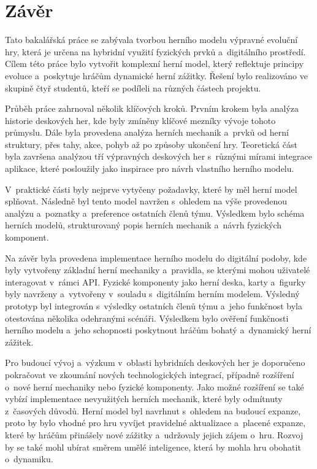 \chapter{Závěr}

Tato bakalářská práce se zabývala tvorbou herního modelu výpravné evoluční hry, která je určena na hybridní využití fyzických prvků a~digitálního prostředí. Cílem této práce bylo vytvořit komplexní herní model, který reflektuje principy evoluce a~poskytuje hráčům dynamické herní zážitky. Řešení bylo realizováno ve skupině čtyř studentů, kteří se podíleli na různých částech projektu.

Průběh práce zahrnoval několik klíčových kroků. Prvním krokem byla analýza historie deskových her, kde byly zmíněny klíčové mezníky vývoje tohoto průmyslu. Dále byla provedena analýza herních mechanik a~prvků od herní struktury, přes tahy, akce, pohyb až po způsoby ukončení hry. Teoretická část byla završena analýzou tří výpravných deskových her s~různými mírami integrace aplikace, které posloužily jako inspirace pro návrh vlastního herního modelu.

V~praktické části byly nejprve vytyčeny požadavky, které by měl herní model splňovat. Následně byl tento model navržen s~ohledem na výše provedenou analýzu a~poznatky a~preference ostatních členů týmu. Výsledkem bylo schéma herních modelů, strukturovaný popis herních mechanik a~návrh fyzických komponent.

Na závěr byla provedena implementace herního modelu do digitální podoby, kde byly vytvořeny základní herní mechaniky a~pravidla, se kterými mohou uživatelé interagovat v~rámci API. Fyzické komponenty jako herní deska, karty a~figurky byly navrženy a~vytvořeny v~souladu s~digitálním herním modelem. Výsledný prototyp byl integrován s~výsledky ostatních členů týmu a~jeho funkčnost byla otestována několika odehranými scénáři. Výsledkem bylo ověření funkčnosti herního modelu a~jeho schopnosti poskytnout hráčům bohatý a~dynamický herní zážitek.

Pro budoucí vývoj a~výzkum v~oblasti hybridních deskových her je doporučeno pokračovat ve zkoumání nových technologických integrací, případně rozšíření o~nové herní mechaniky nebo fyzické komponenty. Jako možné rozšíření se také vybízí implementace nevyužitých herních mechanik, které byly odmítnuty z~časových důvodů. Herní model byl navrhnut s~ohledem na budoucí expanze, proto by bylo vhodné pro hru vyvíjet pravidelné aktualizace a~placené expanze, které by hráčům přinášely nové zážitky a~udržovaly jejich zájem o~hru. Rozvoj by se také mohl ubírat směrem umělé inteligence, která by mohla hru obohatit o~dynamiku.

